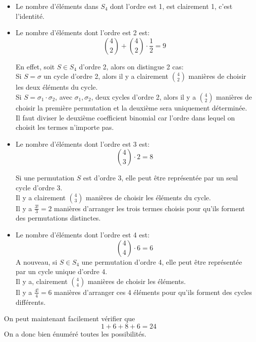 \documentclass[11pt, a4paper]{article}
\begin{document}
\begin{itemize}
\item Le nombre d'éléments dans $S_4$ dont l'ordre est 1, est clairement 1, c'est l'identité.\\
\item Le nombre d'éléments dont l'ordre est 2 est:
	\[ 
		\binom{4}{2} + \binom{4}{2} \cdot \frac{1}{2} = 9
	\]

En effet, soit $S \in S_4$ d'ordre 2, alors on distingue 2 cas:\\
Si $S = \sigma$ un cycle d'ordre 2, alors il y a clairement $\binom{4}{2}$ manières de choisir les deux éléments du cycle.\\
Si $S= \sigma_1 \cdot \sigma_2$, avec $\sigma_1,\sigma_2$, deux cycles d'ordre 2, alors il y a $\binom{4}{2}$ manières de choisir la première permutation et la deuxième sera uniquement déterminée.\\
Il faut diviser le deuxième coefficient binomial car l'ordre dans lequel on choisit les termes n'importe pas.
\item Le nombre d'éléments dont l'ordre est 3 est:
	\[ 
		\binom{4}{3} \cdot 2 = 8
	\]

Si une permutation $S$ est d'ordre 3, elle peut être représentée par un seul cycle d'ordre 3.\\
Il y a clairement $\binom{4}{3}$ manières de choisir les éléments du cycle.\\
Il y a $\frac{3!}{3}=2$ manières d'arranger les trois termes choisis pour qu'ils forment des permutations distinctes.

\item Le nombre d'éléments dont l'ordre est 4 est:
	\[ 
		\binom{4}{4} \cdot 6 = 6
	\]
A nouveau, si $S \in S_4$ une permutation d'ordre 4, elle peut être représentée par un cycle unique d'ordre 4.\\
Il y a, clairement $\binom{4}{4}$ manières de choisir les éléments.\\
Il y a $\frac{4!}{4}=6$ manières d'arranger ces 4 éléments pour qu'ils forment des cycles différents.
\end{itemize}
On peut maintenant facilement vérifier que
\[ 
1 + 6 + 8 + 6 = 24
\]
On a donc bien énuméré toutes les possibilités.
\end{document}
